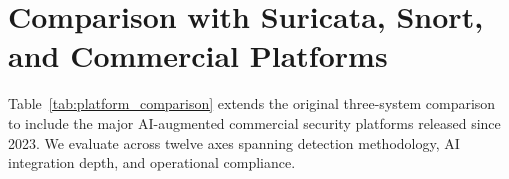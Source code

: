 
\section{Comparison with Suricata, Snort, and Commercial Platforms}
\label{sec:comparison}

Table~\ref{tab:platform_comparison} extends the original three-system
comparison to include the major AI-augmented commercial security platforms
released since 2023.  We evaluate across twelve axes spanning detection
methodology, AI integration depth, and operational compliance.

